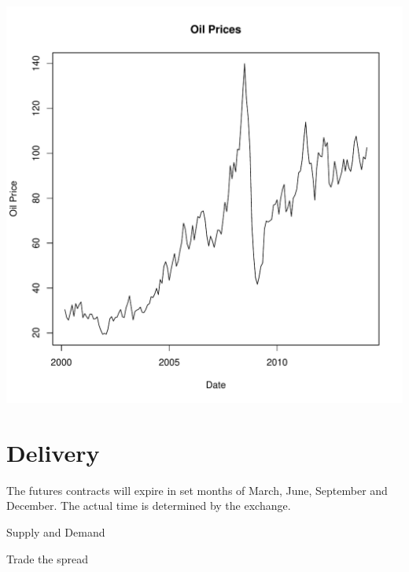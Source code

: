 \documentclass[12pt, a4paper, oneside]{article}\usepackage[]{graphicx}\usepackage[]{color}
\makeatletter
\def\maxwidth{ %
  \ifdim\Gin@nat@width>\linewidth
    \linewidth
  \else
    \Gin@nat@width
  \fi
}
\newenvironment{knitrout}{}{} %
\makeatother
\begin{document}
\begin{knitrout}
\color{fgcolor}
\includegraphics[width=\maxwidth]{figure/oilprice} 

\end{knitrout}


\section*{Delivery}
The futures contracts will expire in set months of March, June, September and December.  The actual time is determined by the exchange. 

Supply and Demand

Trade the spread
\end{document}

